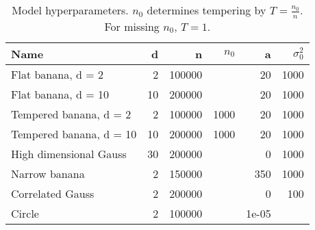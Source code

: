 ﻿\begin{table}[h]
\centering
\caption{
            Model hyperparameters. $n_0$ determines tempering by \(T=\frac{n_0}{n}\).
            For missing $n_0$, \(T = 1\).
            }
\label{model_params_table}
\begin{tabular}{lrrrrr}
\toprule
                   Name &  d &      n &  $n_0$ &     a &  $\sigma^2_0$ \\
\midrule
     Flat banana, d = 2 &  2 & 100000 &        &    20 &          1000 \\
    Flat banana, d = 10 & 10 & 200000 &        &    20 &          1000 \\
 Tempered banana, d = 2 &  2 & 100000 &   1000 &    20 &          1000 \\
Tempered banana, d = 10 & 10 & 200000 &   1000 &    20 &          1000 \\
 High dimensional Gauss & 30 & 200000 &        &     0 &          1000 \\
          Narrow banana &  2 & 150000 &        &   350 &          1000 \\
       Correlated Gauss &  2 & 200000 &        &     0 &           100 \\
                 Circle &  2 & 100000 &        & 1e-05 &               \\
\bottomrule
\end{tabular}
\end{table}
